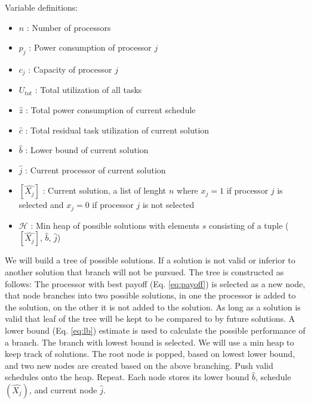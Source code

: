 \documentclass{article}
\begin{document}
    Variable definitions:
    \begin{itemize}
      \item $n$ : Number of processors
      \item $p_{j}$ : Power consumption of processor $j$
      \item $c_{j}$ : Capacity of processor $j$
      \item $U_{tot}$ : Total utilization of all tasks
      \item $\hat{z}$ : Total power consumption of current schedule
      \item $\hat{c}$ : Total residual task utilization of current solution
      \item $\hat{b}$ : Lower bound of current solution
      \item $\hat{j}$ : Current processor of current solution
      \item $[\hat{X_{j}}]$ : Current solution, a list of lenght $n$ where $x_{j} = 1$ if processor $j$ is selected and $x_{j} = 0$ if processor $j$ is not selected
      \item $\mathcal{H}$ : Min heap of possible solutions with elements $s$ consisting of a tuple ($[\hat{X_{j}}]$, $\hat{b}$, $\hat{j}$)
    \end{itemize}

    We will build a tree of possible solutions. If a solution is not valid or inferior to another solution that branch will not be pursued. The tree is constructed as follows: The processor with best payoff (Eq. \ref{eq:payoff}) is selected as a new node, that node branches into two possible solutions, in one the processor is added to the solution, on the other it is not added to the solution. As long as a solution is valid that leaf of the tree will be kept to be compared to by future solutions. A lower bound (Eq. \ref{eq:lb}) estimate is used to calculate the possible performance of a branch. The branch with lowest bound is selected. We will use a min heap to keep track of solutions. The root node is popped, based on lowest lower bound, and two new nodes are created based on the above branching. Push valid schedules onto the heap. Repeat. Each node stores its lower bound $\hat{b}$, schedule $(\hat{X_{j}})$, and current node $\hat{j}$.
\end{document}
